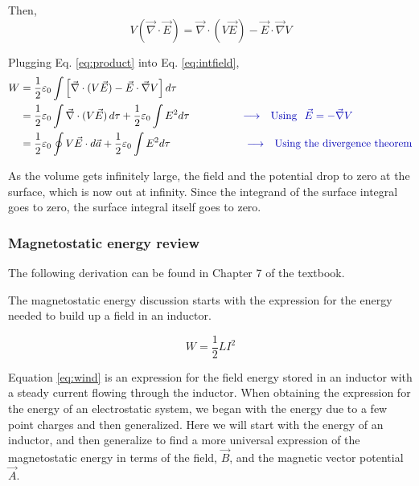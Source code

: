 \documentclass[12pt]{article}
\begin{document}
\begin{flushleft}
Then, 
\begin{equation}
V(\vec{\nabla} \cdot \vec{E})  =  \vec{\nabla} \cdot (V\vec{E}) - \vec{E} \cdot \vec{\nabla}V
\label{eq:product}
\end{equation} 

Plugging Eq. \ref{eq:product} into Eq. \ref{eq:intfield},
\begin{equation*}
\begin{aligned}
W & = \frac{1}{2}\varepsilon_{0} \int \left[ \vec{\nabla} \cdot (V\vec{E}) - \vec{E} \cdot \vec{\nabla}V \right] d\tau \\
& = \frac{1}{2}\varepsilon_{0} \int \vec{\nabla} \cdot (V\vec{E}) \, d\tau + \frac{1}{2}\varepsilon_{0}\int E^{2}  d\tau \hspace{.7in}  {\color{myblue} \longrightarrow \hspace{.1in} \mbox{Using} \hspace{.1in} \vec{E} =-\vec{\nabla}V} \\
& = \frac{1}{2}\varepsilon_{0} \oint V\vec{E} \cdot d\vec{a} + \frac{1}{2}\varepsilon_{0}\int E^{2}  d\tau \hspace{1.in}  {\color{myblue} \longrightarrow \hspace{.1in} \mbox{Using the divergence theorem}}
\end{aligned}
\end{equation*}

 As the volume gets infinitely large, the field and the potential drop to zero at the surface, which is now out at infinity.  Since the integrand of the surface integral goes to zero, the surface integral itself goes to zero.
 
\subsubsection*{\color{myblue} \bf Magnetostatic energy review}

The following derivation can be found in Chapter 7 of the textbook.

The magnetostatic energy discussion starts with the expression for the energy needed to build up a field in an inductor.

\begin{equation}
W=\frac{1}{2}LI^{2}
\label{eq:wind}
\end{equation}

Equation \ref{eq:wind} is an expression for the field energy stored in an inductor with a steady current flowing through the inductor.   When obtaining the expression for the energy of an electrostatic system, we began with the energy due to a few point charges and then generalized.  Here we will start with the energy of an inductor, and then generalize to find a more universal expression of the magnetostatic energy in terms of the field, $\vec{B}$, and the magnetic vector potential $\vec{A}$.


\end{flushleft}
\end{document}
